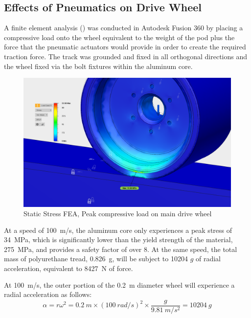 \documentclass[main.tex]{subfiles}
\begin{document}
    \subsection{Effects of Pneumatics on Drive Wheel}

    A finite element analysis () was conducted in Autodesk Fusion 360 by placing a compressive load onto the wheel equivalent to the weight of the pod plus the force that the pneumatic actuators would provide in order to create the required traction force. The track was grounded and fixed in all orthogonal directions and the wheel fixed via the bolt fixtures within the aluminum core.\\

\begin{figure}
        \centering
        \includegraphics[width=\linewidth]{images/fig21}
        \caption{Static Stress FEA, Peak compressive load on main drive wheel}
        \label{fig:drive-wheel-stress}
    \end{figure}

    At a speed of \SI{100}{m/s}, the aluminum core only experiences a peak stress of \SI{34}{MPa}, which is significantly lower than the yield strength of the material, \SI{275}{MPa}, and provides a safety factor of over 8. At the same speed, the total mass of polyurethane tread, \SI{0.826}{g}, will be subject to 10204 $g$ of radial acceleration, equivalent to \SI{8427}{N} of force.\\

    \begin{center}
    At \SI{100}{m/s}, the outer portion of the \SI{0.2}{m} diameter wheel will experience a radial acceleration as follows:
    	\[
  		\alpha=r\omega^2=\SI{0.2}{m}\times (\SI{100}{rad/s})^2 \times \frac{g}{\SI{9.81}{m/s^2}}= 10204\ g
   		\]
    \end{center}
\end{document}
